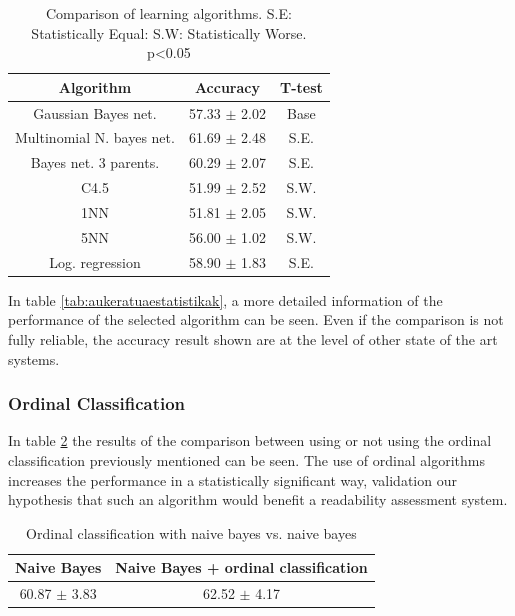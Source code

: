 \documentclass{acm_proc_article-sp}
\begin{document}
\begin{table}
 \begin{center}
 \begin{tabular}{|c|c|c|}\hline
  {\bf Algorithm} & {\bf Accuracy} & {\bf T-test} \\ \hline
   Gaussian Bayes net.             & 57.33 $\pm$ 2.02 & Base \\ \hline
   Multinomial N. bayes net. & 61.69 $\pm$ 2.48 & S.E. \\ \hline
   Bayes net. 3 parents. & 60.29 $\pm$ 2.07 & S.E. \\ \hline
   C4.5                       & 51.99 $\pm$ 2.52 & S.W. \\ \hline
   1NN                       & 51.81 $\pm$ 2.05 & S.W. \\ \hline
   5NN                       & 56.00 $\pm$ 1.02 & S.W. \\ \hline
   Log. regression       & 58.90 $\pm$ 1.83 & S.E. \\ \hline
  
 \end{tabular}
 \end{center}
 \caption{Comparison of learning algorithms. S.E: Statistically Equal: S.W: Statistically Worse. p<0.05}
 \label{tab:sailkapenalgoritmoakasmatze}
\end{table}

In table \ref{tab:aukeratuaestatistikak}, a more detailed information of the performance of the selected algorithm can be seen. Even if the comparison is not fully reliable, the accuracy result shown are at the level of other state of the art systems.
 

\subsubsection{Ordinal Classification}

In table \ref{tab:ordinalttest} the results of the comparison between using or not using the ordinal classification previously mentioned can be seen. The use of ordinal algorithms increases the performance in a statistically significant way, validation our hypothesis that such an algorithm would benefit a readability assessment system.
\begin{table}
 \begin{center}
 \begin{tabular}{|c|c|}\hline
	        Naive Bayes   & Naive Bayes + ordinal classification    \\ \hline
 				60.87 $\pm$ 3.83  &   62.52 $\pm$ 4.17 \\ \hline
 \end{tabular}
 \end{center}
 \caption{Ordinal classification with naive bayes vs. naive bayes}
 \label{tab:ordinalttest}
\end{table} 
\end{document}
